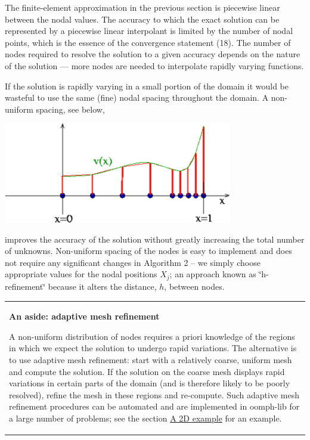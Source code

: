 The finite-\/element approximation in the previous section is piecewise linear between the nodal values. The accuracy to which the exact solution can be represented by a piecewise linear interpolant is limited by the number of nodal points, which is the essence of the convergence statement (18). The number of nodes required to resolve the solution to a given accuracy depends on the nature of the solution --- more nodes are needed to interpolate rapidly varying functions.

If the solution is rapidly varying in a small portion of the domain it would be wasteful to use the same (fine) nodal spacing throughout the domain. A non-\/uniform spacing, see below,  
\begin{DoxyImage}
\includegraphics[width=0.75\textwidth]{fe_adaptive_interpolant}
\end{DoxyImage}
 improves the accuracy of the solution without greatly increasing the total number of unknowns. Non-\/uniform spacing of the nodes is easy to implement and does not require any significant changes in Algorithm 2 -- we simply choose appropriate values for the nodal positions $ X_j $; an approach known as \char`\"{}h-\/refinement\char`\"{} because it alters the distance, $ h $, between nodes.

\begin{center} \tabulinesep=1mm
\begin{longtabu} spread 0pt [c]{*{1}{|X[-1]}|}
\hline
\begin{center} {\bfseries  An aside\+: adaptive mesh refinement }\end{center}   A non-\/uniform distribution of nodes requires a priori knowledge of the regions in which we expect the solution to undergo rapid variations. The alternative is to use adaptive mesh refinement\+: start with a relatively coarse, uniform mesh and compute the solution. If the solution on the coarse mesh displays rapid variations in certain parts of the domain (and is therefore likely to be poorly resolved), refine the mesh in these regions and re-\/compute. Such adaptive mesh refinement procedures can be automated and are implemented in {\ttfamily oomph-\/lib} for a large number of problems; see the section \hyperlink{index_example_P2}{A 2D example} for an example.    \\
\end{longtabu}
\end{center} 

